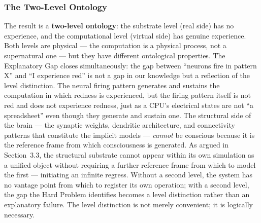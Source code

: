 \documentclass[12pt]{article}
\begin{document}
\subsubsection{The Two-Level Ontology}


The result is a \textbf{two-level ontology}: the substrate level (real side) has no experience, and the computational level (virtual side) has genuine experience. Both levels are physical --- the computation is a physical process, not a supernatural one --- but they have different ontological properties. The Explanatory Gap closes simultaneously: the gap between ``neurons fire in pattern X'' and ``I experience red'' is not a gap in our knowledge but a reflection of the level distinction. The neural firing pattern generates and sustains the computation in which redness is experienced, but the firing pattern itself is not red and does not experience redness, just as a CPU's electrical states are not ``a spreadsheet'' even though they generate and sustain one. The structural side of the brain --- the synaptic weights, dendritic architecture, and connectivity patterns that constitute the implicit models --- \emph{cannot} be conscious because it is the reference frame from which consciousness is generated. As argued in Section~3.3, the structural substrate cannot appear within its own simulation as a unified object without requiring a further reference frame from which to model the first --- initiating an infinite regress. Without a second level, the system has no vantage point from which to register its own operation; with a second level, the gap the Hard Problem identifies becomes a level distinction rather than an explanatory failure. The level distinction is not merely convenient; it is logically necessary.
\end{document}
